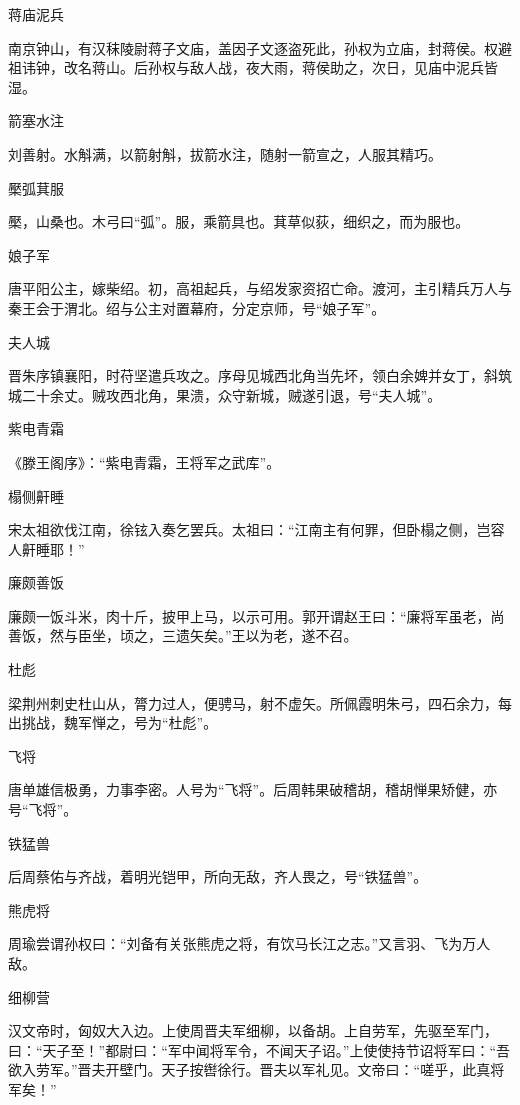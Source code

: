 \documentclass[a4paper,12pt,UTF8,twoside]{ctexbook}
\begin{document}
    蒋庙泥兵
    
    南京钟山，有汉秣陵尉蒋子文庙，盖因子文逐盗死此，孙权为立庙，封蒋侯。权避祖讳钟，改名蒋山。后孙权与敌人战，夜大雨，蒋侯助之，次日，见庙中泥兵皆湿。
    
    箭塞水注
    
    刘善射。水斛满，以箭射斛，拔箭水注，随射一箭宣之，人服其精巧。
    
    檿弧萁服
    
    檿，山桑也。木弓曰“弧”。服，乘箭具也。萁草似荻，细织之，而为服也。
    
    娘子军
    
    唐平阳公主，嫁柴绍。初，高祖起兵，与绍发家资招亡命。渡河，主引精兵万人与秦王会于渭北。绍与公主对置幕府，分定京师，号“娘子军”。
    
    夫人城
    
    晋朱序镇襄阳，时苻坚遣兵攻之。序母见城西北角当先坏，领白余婢并女丁，斜筑城二十余丈。贼攻西北角，果溃，众守新城，贼遂引退，号“夫人城”。
    
    紫电青霜
    
    《滕王阁序》：“紫电青霜，王将军之武库”。
    
    榻侧鼾睡
    
    宋太祖欲伐江南，徐铉入奏乞罢兵。太祖曰：“江南主有何罪，但卧榻之侧，岂容人鼾睡耶！”
    
    廉颇善饭
    
    廉颇一饭斗米，肉十斤，披甲上马，以示可用。郭开谓赵王曰：“廉将军虽老，尚善饭，然与臣坐，顷之，三遗矢矣。”王以为老，遂不召。
    
    杜彪
    
    梁荆州刺史杜山从，膂力过人，便骋马，射不虚矢。所佩霞明朱弓，四石余力，每出挑战，魏军惮之，号为“杜彪”。
    
    飞将
    
    唐单雄信极勇，力事李密。人号为“飞将”。后周韩果破稽胡，稽胡惮果矫健，亦号“飞将”。
    
    铁猛兽
    
    后周蔡佑与齐战，着明光铠甲，所向无敌，齐人畏之，号“铁猛兽”。
    
    熊虎将
    
    周瑜尝谓孙权曰：“刘备有关张熊虎之将，有饮马长江之志。”又言羽、飞为万人敌。
    
    细柳营
    
    汉文帝时，匈奴大入边。上使周晋夫军细柳，以备胡。上自劳军，先驱至军门，曰：“天子至！”都尉曰：“军中闻将军令，不闻天子诏。”上使使持节诏将军曰：“吾欲入劳军。”晋夫开壁门。天子按辔徐行。晋夫以军礼见。文帝曰：“嗟乎，此真将军矣！”
    
\end{document}
